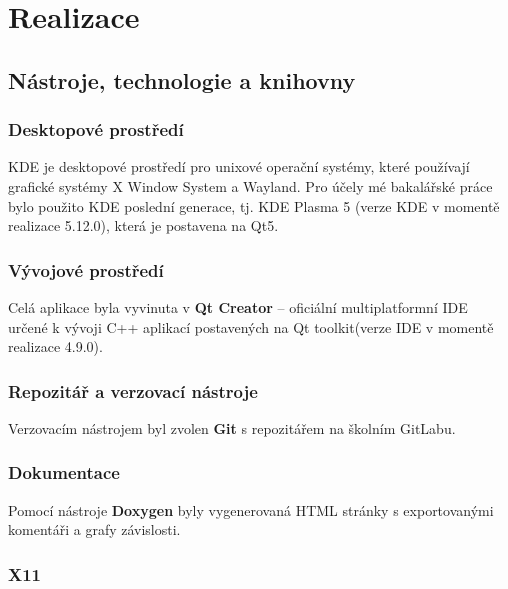 \documentclass[thesis=B,czech]{FITthesis}[2012/06/26]
\begin{document}
	

\chapter{Realizace}

\section{Nástroje, technologie a knihovny}



\subsection{Desktopové prostředí}

KDE je desktopové prostředí pro unixové operační systémy, které používají grafické systémy X Window System a Wayland. Pro účely mé bakalářské práce bylo použito KDE poslední generace, tj. KDE Plasma 5 (verze KDE v momentě realizace 5.12.0), která je postavena na Qt5.

\subsection{Vývojové prostředí}
Celá aplikace byla vyvinuta v \textbf{Qt Creator} -- oficiální multiplatformní IDE určené k vývoji C++ aplikací postavených na Qt toolkit(verze IDE v momentě realizace 4.9.0). 

\subsection{Repozitář a verzovací nástroje}
	Verzovacím nástrojem byl zvolen \textbf{Git} s repozitářem na školním GitLabu. 
	
\subsection{Dokumentace}
Pomocí nástroje \textbf{Doxygen} byly vygenerovaná HTML stránky s exportovanými komentáři a grafy závislosti.  

\subsection{X11}
\end{document}
